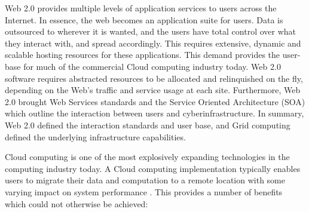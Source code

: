 Web 2.0 provides multiple levels of application services to users across the Internet.  In essence, the web becomes an application suite for users.  Data is outsourced to wherever it is wanted, and the users have total control over what they interact with, and spread accordingly.  This requires extensive, dynamic and scalable hosting resources for these applications. This demand provides the user-base for much of the commercial Cloud computing industry today.  Web 2.0 software requires abstracted resources to be allocated and relinquished on the fly, depending on the Web's traffic and service usage at each site.  Furthermore, Web 2.0 brought Web Services standards \cite{wsci} and the Service Oriented Architecture (SOA) \cite{krafzig2004} which outline the interaction between users and cyberinfrastructure.  In summary, Web 2.0 defined the interaction standards and user base, and Grid computing defined the underlying infrastructure capabilities.  

Cloud computing \cite{Armbrust2010} is one of the most explosively expanding technologies in the computing industry today. A Cloud computing implementation typically enables users to migrate their data and computation to a remote location with some varying impact on system performance \cite{wang2010ngc}.  This provides a number of benefits which could not otherwise be achieved:  


